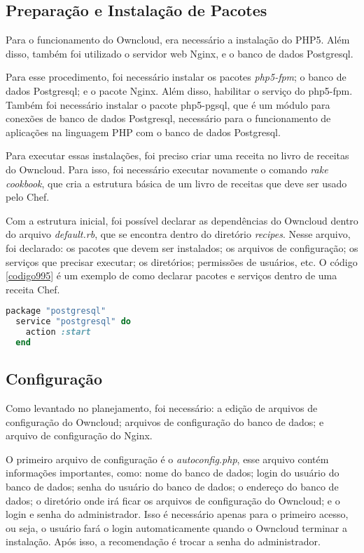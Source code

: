 \subsection{Preparação e Instalação de Pacotes}

Para o funcionamento do Owncloud, era necessário a instalação do PHP5. Além
disso, também foi utilizado o servidor web Nginx, e o 
banco de dados Postgresql.

Para esse procedimento, foi necessário instalar os pacotes \textit{php5-fpm}; o banco
de dados Postgresql; e o pacote Nginx. Além disso, habilitar o serviço do php5-fpm. 
Também foi necessário instalar o pacote php5-pgsql, que é um módulo para
conexões de banco de dados Postgresql, necessário para o funcionamento de
aplicações na linguagem PHP com o banco de dados Postgresql.

Para executar essas instalações, foi preciso criar uma receita no livro de receitas
do Owncloud. Para isso, foi necessário executar novamente o comando \textit{rake cookbook}, 
que cria a estrutura básica de um livro de receitas que deve ser usado pelo Chef. 

Com a estrutura inicial, foi possível declarar as dependências do Owncloud
dentro do arquivo \textit{default.rb}, que se encontra dentro do diretório 
\textit{recipes}. Nesse arquivo, foi 
declarado: os pacotes que devem ser instalados; os arquivos de configuração;
os serviços que precisar executar; os diretórios; permissões de usuários, etc. O código
\ref{codigo995} é um exemplo
de como declarar pacotes e serviços dentro de uma receita Chef.

\begin{lstlisting}[language=Ruby,label=dice_index,caption={Exemplo de como habilitar serviço do postgresql com chef}, label=codigo995]
  package "postgresql"
  service "postgresql" do
    action :start
  end
\end{lstlisting}

\subsection{Configuração}

Como levantado no planejamento, foi necessário: a edição de arquivos de configuração
do Owncloud; arquivos de configuração do banco de dados; e arquivo de configuração
do Nginx.

O primeiro arquivo de configuração é o \textit{autoconfig.php}, esse arquivo
contém informações importantes, como: nome do banco de dados;
login do usuário do banco de dados; senha do usuário do banco de dados; o endereço 
do banco de dados; o diretório
onde irá ficar os arquivos de configuração do Owncloud; e o login e senha
do administrador. Isso é necessário apenas para o primeiro acesso, ou seja, o usuário
fará o login automaticamente quando o Owncloud terminar a instalação. Após isso,
a recomendação é trocar a senha do administrador.

